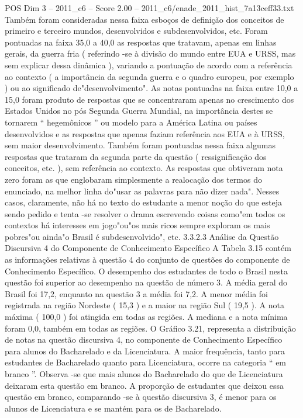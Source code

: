 \begin{textsample}{POS Dim 3 – 2011\_c6 – Score 2.00 – 2011\_c6/enade\_2011\_hist\_7a13ceff33.txt}
Também foram consideradas nessa faixa esboços de definição dos conceitos de primeiro e terceiro mundos, desenvolvidos e subdesenvolvidos, etc.
Foram pontuadas na faixa 35,0 a 40,0 as respostas que tratavam, apenas em linhas gerais, da guerra fria ( referindo -se à divisão do mundo entre EUA e URSS, mas sem explicar dessa dinâmica ), variando a pontuação de acordo com a referência ao contexto ( a importância da segunda guerra e o quadro europeu, por exemplo ) ou ao significado de"desenvolvimento".
As notas pontuadas na faixa entre 10,0 a 15,0 foram produto de respostas que se concentraram apenas no crescimento dos Estados Unidos no pós Segunda Guerra Mundial, na importância destes se tornarem “ hegemônicos ” ou modelo para a América Latina ou países desenvolvidos e as respostas que apenas faziam referência aos EUA e à URSS, sem maior desenvolvimento.
Também foram pontuadas nessa faixa algumas respostas que trataram da segunda parte da questão ( ressignificação dos conceitos, etc. ), sem referência ao contexto.
As respostas que obtiveram nota zero foram as que englobaram simplesmente a realocação dos termos do enunciado, na melhor linha do"usar as palavras para não dizer nada".
Nesses casos, claramente, não há no texto do estudante a menor noção do que esteja sendo pedido e tenta -se resolver o drama escrevendo coisas como"em todos os contextos há interesses em jogo"ou"os mais ricos sempre exploram os mais pobres"ou ainda"o Brasil é subdesenvolvido", etc. 3.3.2.3 Análise da Questão Discursiva 4 do Componente de Conhecimento Específico A Tabela 3.15 contém as informações relativas à questão 4 do conjunto de questões do componente de Conhecimento Específico.
O desempenho dos estudantes de todo o Brasil nesta questão foi superior ao desempenho na questão de número 3.
A média geral do Brasil foi 17,2, enquanto na questão 3 a média foi 7,2.
A menor média foi registrada na região Nordeste ( 15,3 ) e a maior na região Sul ( 19,5 ).
A nota máxima ( 100,0 ) foi atingida em todas as regiões.
A mediana e a nota mínima foram 0,0, também em todas as regiões.
O Gráfico 3.21, representa a distribuição de notas na questão discursiva 4, no componente de Conhecimento Específico para alunos do Bacharelado e da Licenciatura.
A maior frequência, tanto para estudantes de Bacharelado quanto para Licenciatura, ocorre na categoria “ em branco ”.
Observa -se que mais alunos do Bacharelado do que de Licenciatura deixaram esta questão em branco.
A proporção de estudantes que deixou essa questão em branco, comparando -se à questão discursiva 3, é menor para os alunos de Licenciatura e se mantém para os de Bacharelado.

\end{textsample}
